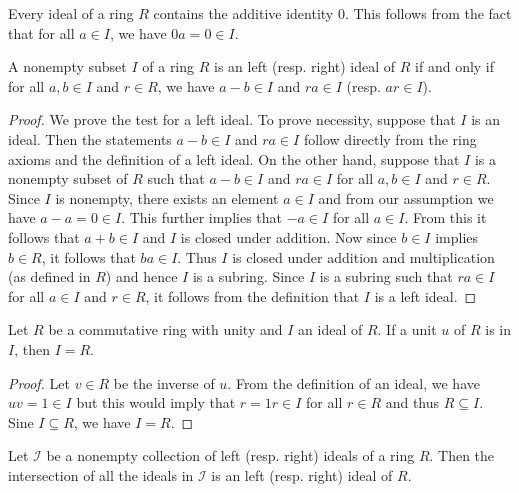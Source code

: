 \begin{remark}
    \label{rem:ideal-contains-0}
    Every ideal of a ring \(R\) contains the additive identity \(0\). This follows from the fact that for all \(a \in I\), we have \(0a = 0 \in I\).
\end{remark}

\begin{theorem}
    A nonempty subset \(I\) of a ring \(R\) is an left (resp. right) ideal of \(R\) if and only if for all \(a, b \in I\) and \(r \in R\), we have \(a - b \in I\) and \(ra \in I\) (resp. \(ar \in I\)).
\end{theorem}

\begin{proof}
    We prove the test for a left ideal. To prove necessity, suppose that \(I\) is an ideal. Then the statements \(a - b \in I\) and \(ra \in I\) follow directly from the ring axioms and the definition of a left ideal. On the other hand, suppose that \(I\) is a nonempty subset of \(R\) such that \(a - b \in I\) and \(ra \in I\) for all \(a, b \in I\) and \(r \in R\). Since \(I\) is nonempty, there exists an element \(a \in I\) and from our assumption we have \(a - a = 0 \in I\). This further implies that \(-a \in I\) for all \(a \in I\). From this it follows that \(a + b \in I\) and \(I\) is closed under addition. Now since \(b \in I\) implies \(b \in R\), it follows that \(ba \in I\). Thus \(I\) is closed under addition and multiplication (as defined in \(R\)) and hence \(I\) is a subring. Since \(I\) is a subring such that \(ra \in I\) for all \(a \in I\) and \(r \in R\), it follows from the definition that \(I\) is a left ideal.
\end{proof}

\begin{theorem}
    Let \(R\) be a commutative ring with unity and \(I\) an ideal of \(R\). If a unit \(u\) of \(R\) is in \(I\), then \(I = R\).
\end{theorem}

\begin{proof}
    Let \(v \in R\) be the inverse of \(u\). From the definition of an ideal, we have \(uv = 1 \in I\) but this would imply that \(r = 1r \in I\) for all \(r \in R\) and thus \(R \subseteq I\). Sine \(I \subseteq R\), we have \(I = R\).
\end{proof}

\begin{theorem}
    Let \(\mathcal{I}\) be a nonempty collection of left (resp. right) ideals of a ring \(R\). Then the intersection of all the ideals in \(\mathcal{I}\) is an left (resp. right) ideal of \(R\).
\end{theorem}

